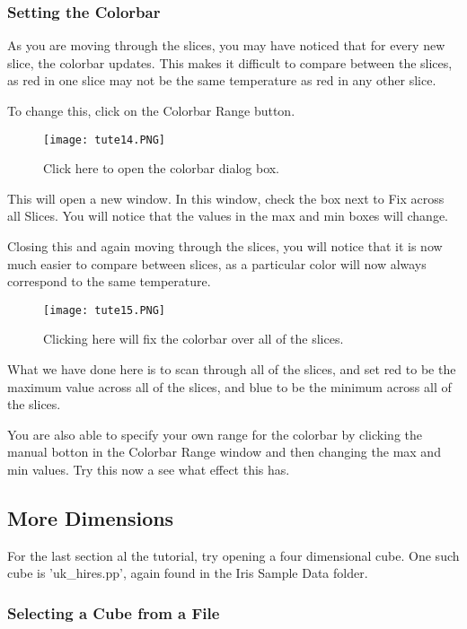 \documentclass[a4paper,12pt]{article}
\begin{document}
\subsubsection{Setting the Colorbar}

As you are moving through the slices, you may have noticed that for every new
slice, the colorbar updates. This makes it difficult to compare between the
slices, as red in one slice may not be the same temperature as red in any other
slice.

To change this, click on the Colorbar Range button.

\begin{figure}[H]
\centering
\texttt{[image: tute14.PNG]}
\caption{Click here to open the colorbar dialog box.}
\label{overflow}
\end{figure}

This will open a new window. In this window, check the box next to Fix across
all Slices. You will notice that the values in the max and min boxes will change.

Closing this and again moving through the slices, you will notice that it is
now much easier to compare between slices, as a particular color will now
always correspond to the same temperature.

\begin{figure}[H]
\centering
\texttt{[image: tute15.PNG]}
\caption{Clicking here will fix the colorbar over all of the slices.}
\label{overflow}
\end{figure}

What we have done here is to scan through all of the slices, and set red to be
the maximum value across all of the slices, and blue to be the minimum across
all of the slices.

You are also able to specify your own range for the colorbar by clicking the
manual botton in the Colorbar Range window and then changing the max and min
values. Try this now a see what effect this has.

\subsection{More Dimensions}

For the last section al the tutorial, try opening a four dimensional cube. One
such cube is 'uk\_hires.pp', again found in the Iris Sample Data folder.

\subsubsection{Selecting a Cube from a File}
\end{document}
